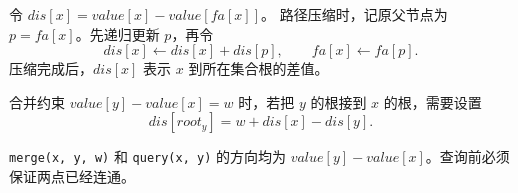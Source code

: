 令 \(dis[x]=value[x]-value[fa[x]]\)。
路径压缩时，记原父节点为 \(p=fa[x]\)。先递归更新 \(p\)，再令
\[
  dis[x]\gets dis[x]+dis[p],\qquad fa[x]\gets fa[p].
\]
压缩完成后，\(dis[x]\) 表示 \(x\) 到所在集合根的差值。

合并约束 \(value[y]-value[x]=w\) 时，若把 \(y\) 的根接到 \(x\) 的根，需要设置
\[
  dis[root_y]=w+dis[x]-dis[y].
\]

\begin{icpcwarning}[符号约定]
  \texttt{merge(x, y, w)} 和 \texttt{query(x, y)} 的方向均为
  \(value[y]-value[x]\)。查询前必须保证两点已经连通。
\end{icpcwarning}
